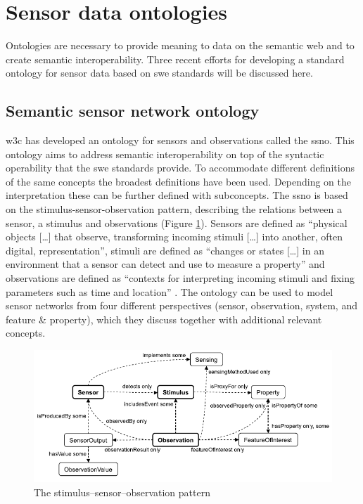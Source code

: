 \section{Sensor data ontologies}
\label{par:ontologies}

Ontologies are necessary to provide meaning to data on the semantic web and to create semantic interoperability. Three recent efforts for developing a standard ontology for sensor data based on \ac{swe} standards will be discussed here.

\subsection{Semantic sensor network ontology} 
\ac{w3c} has developed an ontology for sensors and observations called the \ac{ssno}. This ontology aims to address semantic interoperability on top of the syntactic operability that the \ac{swe} standards provide. To accommodate different definitions of the same concepts the broadest definitions have been used. Depending on the interpretation these can be further defined with subconcepts. The \ac{ssno} is based on the stimulus-sensor-observation pattern, describing the relations between a sensor, a stimulus and observations (Figure \ref{fig:sens-stim-obs}). Sensors are defined as \enquote{physical objects [\ldots] that observe, transforming incoming stimuli [\ldots] into another, often digital, representation}, stimuli are defined as \enquote{changes or states [\ldots] in an environment that a sensor can detect and use to measure a property} and observations are defined as \enquote{contexts for interpreting incoming stimuli and fixing parameters such as time and location} \cite[p. 28]{SSW:SSN_incubatorGroup}. The ontology can be used to model sensor networks from four different perspectives (sensor, observation, system, and feature \& property), which they discuss together with additional relevant concepts.

\begin{figure}
	\centering
	\includegraphics[width=1\linewidth]{figs/sens_stim_obs.png}
	\caption{The stimulus–sensor–observation pattern \cite[p. 28]{SSW:SSN_incubatorGroup}}
	\label{fig:sens-stim-obs}
\end{figure}

